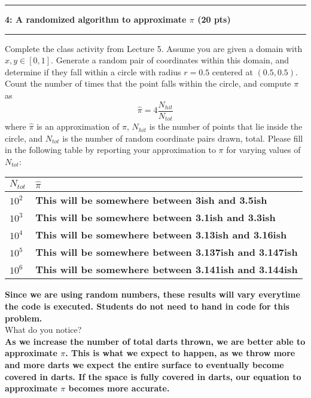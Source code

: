 \documentclass[11pt]{article}
\newcommand\question[2]{\vspace{.25in}\hrule\textbf{#1: #2}\vspace{.5em}\hrule\vspace{.10in}}
\begin{document}
\vspace{1cm}
\question{4}{A randomized algorithm to approximate $\pi$ (20 pts)}
Complete the class activity from Lecture 5. Assume you are given a domain with $x, y
\in \left[0,1\right]$. Generate a random pair of coordinates within this domain,
and determine if they fall within a circle with radius $r = 0.5$ centered at
$(0.5,0.5)$. Count the number of times that the point falls within the circle,
and compute $\pi$ as
\begin{equation*}
    \hat{\pi} = 4 \frac{N_{hit}}{N_{tot}}
\end{equation*}
where $\hat{\pi}$ is an approximation of $\pi$, $N_{hit}$ is the number of points that lie inside the circle, and
$N_{tot}$ is the number of random coordinate pairs drawn, total. Please fill in
the following table by reporting your approximation to $\pi$ for varying values
of $N_{tot}$:
\vspace{0.5cm}
\begin{table}[H]
    \center
    \begin{tabular}{|l|l|}
    \hline
        $N_{tot}$ & \quad \text{ } $\hat{\pi}$ \\ \hline
    $10^2$    & \textbf{This will be somewhere between 3ish and 3.5ish} \\ \hline
    $10^{3}$  & \textbf{This will be somewhere between 3.1ish and 3.3ish }\\ \hline
    $10^{4}$  & \textbf{This will be somewhere between 3.13ish and 3.16ish} \\ \hline
    $10^{5}$  &	\textbf{This will be somewhere between 3.137ish and 3.147ish} \\ \hline
    $10^{6}$  &	\textbf{This will be somewhere between 3.141ish and 3.144ish} \\ \hline
    \end{tabular}
\end{table}
\textbf{Since we are using random numbers, these results will vary everytime the code is executed. Students do not need to hand in code for this problem.} \\ \vspace{5pt}
What do you notice? \\
\vspace{5pt}
\textbf{As we increase the number of total darts thrown, we are better able to approximate $\pi$. This is what we expect to happen, as we throw more and more darts we expect the entire surface to eventually become covered in darts. If the space is fully covered in darts, our equation to approximate $\pi$ becomes more accurate. } 
\end{document}

